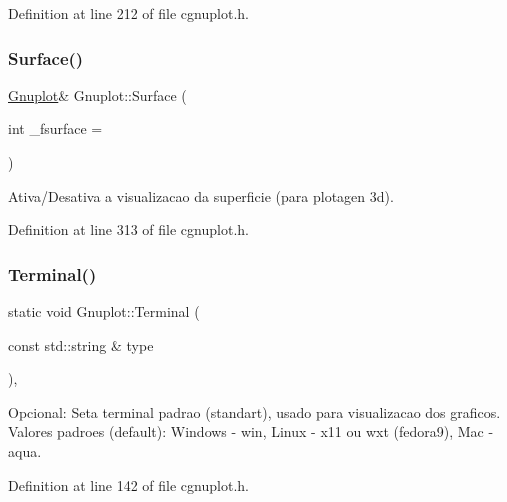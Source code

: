 Definition at line 212 of file cgnuplot.\+h.

\mbox{\label{class_gnuplot_a7b338ff4ec6c49659cd2022b68c0e861}} 
\subsubsection{\texorpdfstring{Surface()}{Surface()}}
{\footnotesize\ttfamily \hyperlink{class_gnuplot}{Gnuplot}\& Gnuplot\+::\+Surface (\begin{DoxyParamCaption}\item[{int}]{\+\_\+fsurface = {} }\end{DoxyParamCaption})\hspace{0.3cm}{\ttfamily [inline]}}



Ativa/\+Desativa a visualizacao da superficie (para plotagen 3d). 



Definition at line 313 of file cgnuplot.\+h.

\mbox{\label{class_gnuplot_a4039b0fdcf0e3fbf97dac187825138fb}} 
\subsubsection{\texorpdfstring{Terminal()}{Terminal()}}
{\footnotesize\ttfamily static void Gnuplot\+::\+Terminal (\begin{DoxyParamCaption}\item[{const std\+::string \&}]{type }\end{DoxyParamCaption})\hspace{0.3cm}{\ttfamily [inline]}, {\ttfamily [static]}}



Opcional\+: Seta terminal padrao (standart), usado para visualizacao dos graficos. Valores padroes (default)\+: Windows -\/ win, Linux -\/ x11 ou wxt (fedora9), Mac -\/ aqua. 



Definition at line 142 of file cgnuplot.\+h.

\mbox{\label{class_gnuplot_a73bb8c97a946cafea0eca683450a6a62}} 
